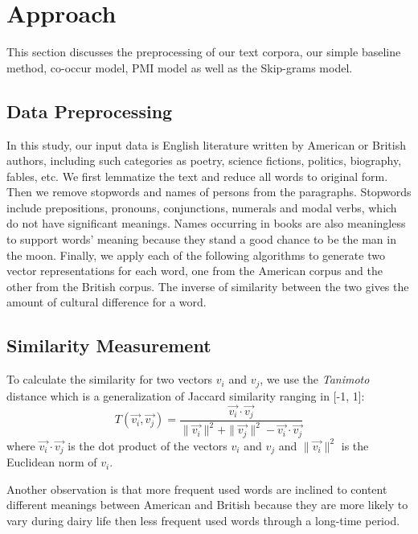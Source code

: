 \section{Approach}
This section discusses the preprocessing of our text corpora, our
simple baseline method, co-occur model, PMI model as well as the Skip-grams model.

\subsection{Data Preprocessing}

In this study, our input data is English literature written by
American or British authors, including such categories as poetry,
science fictions, politics, biography, fables, etc.
We first lemmatize the text and reduce all words to original form.
Then we remove stopwords and names of persons\cite{names} from the paragraphs.
Stopwords include prepositions, pronouns, conjunctions, 
numerals and modal verbs, which do not have significant meanings.
Names occurring in books are also meaningless to support words' meaning
because they stand a good chance to be the man in the moon.  
Finally, we apply each of the following algorithms to generate two vector
representations for each word, one from the American corpus and the other
from the British corpus. The inverse of similarity between the
two gives the amount of cultural difference for a word.

\subsection{Similarity Measurement}

To calculate the similarity for two vectors $v_i$ and $v_j$, 
we use the \emph{Tanimoto} distance
which is a generalization of Jaccard similarity ranging in [-1, 1]:
\begin{equation*}    
    T(\overrightarrow{v_i}, \overrightarrow{v_j}) = 
    \frac{\overrightarrow{v_i} \cdot \overrightarrow{v_j}}
    {\|\overrightarrow{v_i}\|^2 + \|\overrightarrow{v_j}\|^2
    - \overrightarrow{v_i} \cdot \overrightarrow{v_j}}
\end{equation*}
where ${\overrightarrow{v_i} \cdot \overrightarrow{v_j}}$ is the dot product of
the vectors $v_i$ and $v_j$ and ${\|\overrightarrow{v_i}\|^2}$ is the Euclidean
norm of $v_i$.

Another observation is that more frequent used words are inclined to content different
meanings between American and British because they are more likely to vary during dairy life
then less frequent used words through a long-time period.

